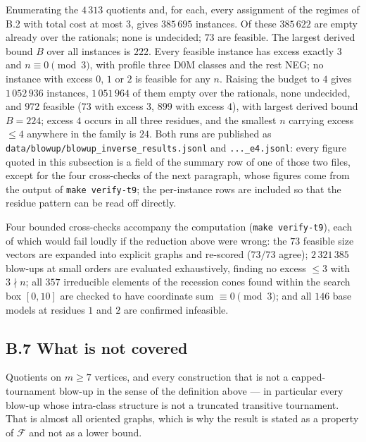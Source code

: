 \documentclass[11pt]{amsart}
\theoremstyle{remark}
\begin{document}
Enumerating the $4\,313$ quotients and, for each, every assignment of the
regimes of B.2 with total cost at most $3$, gives $385\,695$ instances. Of
these $385\,622$ are empty already over the rationals; none is undecided;
$73$ are feasible. The largest derived bound $B$ over all instances is $222$.
Every feasible instance has excess exactly $3$ and $n \equiv 0 \pmod 3$, with
profile three D0M classes and the rest NEG; no instance with excess $0$, $1$
or $2$ is feasible for any $n$. Raising the budget to $4$ gives
$1\,052\,936$ instances, $1\,051\,964$ of them empty over the rationals, none
undecided, and $972$ feasible ($73$ with excess $3$, $899$ with excess $4$),
with largest derived bound $B = 224$; excess $4$ occurs in all three residues,
and the smallest $n$ carrying excess $\le 4$ anywhere in the family is $24$.
Both runs are published as \texttt{data/blowup/blowup\_inverse\_results.jsonl}
and \texttt{...\_e4.jsonl}: every figure quoted in this subsection is a field
of the summary row of one of those two files, except for the four
cross-checks of the next paragraph, whose figures come from the output of
\texttt{make verify-t9}; the per-instance rows are included so that the
residue pattern can be read off directly.

Four bounded cross-checks accompany the computation
(\texttt{make verify-t9}), each of which would fail loudly if the reduction
above were wrong: the $73$ feasible size vectors are expanded into explicit
graphs and re-scored ($73/73$ agree); $2\,321\,385$ blow-ups at small orders
are evaluated exhaustively, finding no excess $\le 3$ with $3 \nmid n$; all
$357$ irreducible elements of the recession cones found within the search
box $[0,10]$ are checked to have
coordinate sum $\equiv 0 \pmod 3$; and all $146$ base models at residues $1$
and $2$ are confirmed infeasible.

\subsection*{B.7 What is not covered}

Quotients on $m \ge 7$ vertices, and every construction that is not a
capped-tournament blow-up in the sense of the definition above --- in
particular every blow-up whose intra-class structure is not a truncated
transitive tournament. That is almost all oriented graphs, which is why the
result is stated as a property of $\mathcal{F}$ and not as a lower bound.



\end{document}
